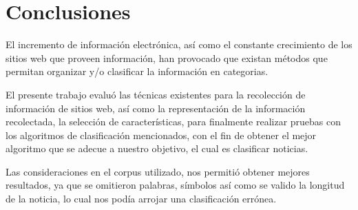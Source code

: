 \section{Conclusiones}

El incremento de información electrónica, así como el constante crecimiento de los sitios web que proveen información, han provocado que existan métodos que permitan organizar y/o clasificar la información en categorias.

El presente trabajo evaluó las técnicas existentes para la recolección de información de sitios web, así como la representación de la información recolectada, la selección de características, para finalmente realizar pruebas con los algoritmos de clasificación mencionados, con el fin de obtener el mejor algoritmo que se adecue a nuestro objetivo, el cual es clasificar noticias.

Las consideraciones en el corpus utilizado, nos permitió obtener mejores resultados, ya que se omitieron palabras, símbolos así como se valido la longitud de la noticia, lo cual nos podía arrojar una clasificación errónea.
